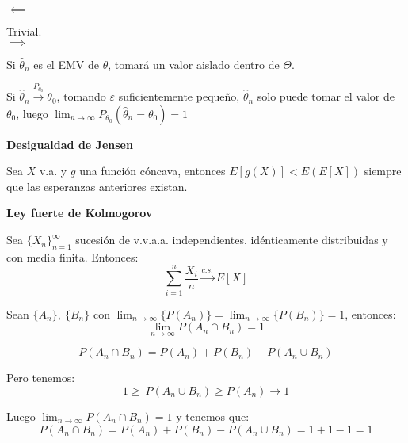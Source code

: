 \documentclass[openany]{book}
\begin{document}
\begin{demonstration}
    $  $\\
    $ \impliedby $

    Trivial.\\
    $ \implies $

    Si $ \hat{\theta}_{n} $ es el EMV de $ \theta $, tomará un valor aislado dentro de $ \Theta $.
    
    Si $ \hat{\theta}_{n} \xrightarrow{P_{\theta_0}} \theta_0 $, tomando $ \varepsilon $ suficientemente pequeño, $ \hat{\theta}_{n} $ solo puede tomar el valor de $ \theta_0   $, luego $ \lim_{n \to \infty}P_{\theta_0}(\hat{\theta}_{n} = \theta_0) = 1 $


\end{demonstration}

\begin{proposition}
    \textbf{Desigualdad de Jensen}

    Sea $ X $ v.a. y $ g $ una función cóncava, entonces $ E[g(X)]<E(E[X]) $ siempre que las esperanzas anteriores existan.
\end{proposition}

\begin{proposition}
    \textbf{Ley fuerte de Kolmogorov}

    Sea $ \{X_n\}_{n=1}^{\infty} $ sucesión de v.v.a.a. independientes, idénticamente distribuidas y con media finita. Entonces:
    $$ \sum\limits_{i=1}^{n} \dfrac{X_i}{n} \xrightarrow{c.s.} E[X] $$
\end{proposition}

\begin{lemma}
    Sean $ \{A_n\},\ \{B_n\} $ con $ \lim_{n \to \infty}\{P(A_n)\} = \lim_{n \to \infty} \{P(B_n)\} = 1 $, entonces:
    $$ \lim_{n \to \infty} P(A_n \cap B_n) = 1 $$
\end{lemma}

\begin{demonstration}
    $$ P(A_n \cap B_n) = P(A_n) + P(B_n) - P(A_n \cup B_n) $$
    
    Pero tenemos:
    $$ 1 \geq\ P(A_n\cup B_n) \geq P(A_n) \to 1 $$
    
    Luego $ \lim_{n \to \infty}P(A_n \cap B_n) = 1 $ y tenemos que:
    $$ P(A_n \cap B_n) = P(A_n) + P(B_n) - P(A_n \cup B_n) = 1 +1-1 =1 $$

\end{demonstration}
\end{document}
